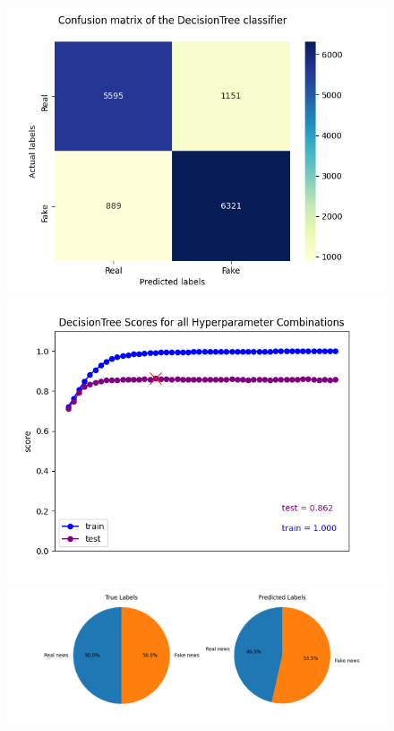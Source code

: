 \documentclass[10pt,twocolumn,letterpaper]{article}
\begin{document}
\begin{figure}[h]
   \begin{center}
        \includegraphics[scale=0.8]{graphs/DT/confusion_matrix.png}
        \includegraphics[scale=0.8]{graphs/DT/scores_plot.png}
        \includegraphics[scale=0.6]{graphs/DT/piechart.png}
   \end{center}
        \vspace*{-5mm}
        \caption{\label{Second_figure}}
\end{figure}
\end{document}
